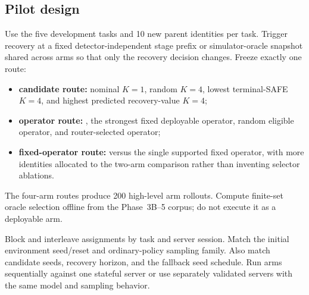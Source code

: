 

\subsection{Pilot design}

Use the five development tasks and 10 new parent identities per task. Trigger recovery at a fixed detector-independent stage prefix or simulator-oracle snapshot shared across arms so that only the recovery decision changes. Freeze exactly one route:
\begin{itemize}
  \item \textbf{candidate route:} nominal $K=1$, random $K=4$, lowest terminal-SAFE $K=4$, and highest predicted recovery-value $K=4$;
  \item \textbf{operator route:} , the strongest fixed deployable operator, random eligible operator, and router-selected operator;
  \item \textbf{fixed-operator route:}  versus the single supported fixed operator, with more identities allocated to the two-arm comparison rather than inventing selector ablations.
\end{itemize}
The four-arm routes produce 200 high-level arm rollouts. Compute finite-set oracle selection offline from the Phase~3B--5 corpus; do not execute it as a deployable arm.

Block and interleave assignments by task and server session. Match the initial environment seed/reset and ordinary-policy sampling family. Also match candidate seeds, recovery horizon, and the fallback seed schedule. Run arms sequentially against one stateful server or use separately validated servers with the same model and sampling behavior.


